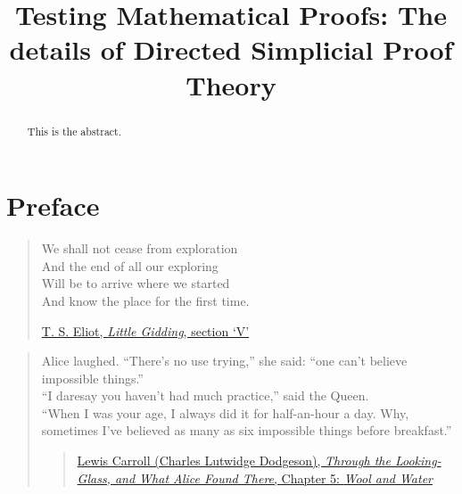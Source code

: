 \documentclass[a4paper,openany]{amsbook}
\begin{document}
\frontmatter
\sloppy

\title[DiSimplicial Proof Theory]{Testing Mathematical Proofs: The details of
Directed Simplicial Proof Theory}

%

\begin{abstract}
This is the abstract.
\end{abstract}

\tableofcontents
\mainmatter

\chapter*{Preface}

\begin{quotation}
We shall not cease from exploration \\
And the end of all our exploring \\
Will be to arrive where we started \\
And know the place for the first time.

\href{http://www.davidgorman.com/4Quartets/4-gidding.htm}{T. S. Eliot,
\textit{Little Gidding}, section `V'}
\end{quotation}

\vspace{0.5cm}

\begin{quotation}
Alice laughed. ``There's no use trying,'' she said: ``one can't believe
impossible things.'' \\ 
``I daresay you haven't had much practice,'' said the Queen. \\
``When I was your age, I always did it for half-an-hour a day. Why, sometimes
I've believed as many as six impossible things before breakfast.''

\begin{quote}
\href{http://en.wikiquote.org/wiki/Through_the_Looking-Glass#Chapter_5:_Wool_and_Water}{Lewis
Carroll (Charles Lutwidge Dodgeson), \textit{Through the Looking-Glass, and
What Alice Found There}, Chapter 5: \textit{Wool and Water}}
\end{quote}
\end{quotation}
\end{document}
